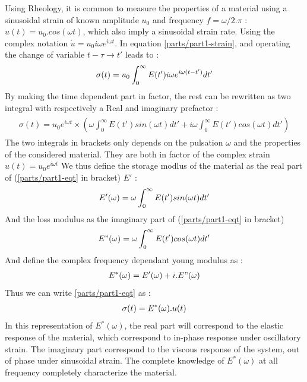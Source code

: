 \documentclass[A4paperpaper,11pt,english]{sphinxmanual}
\begin{document}
Using Rheology, it is common to measure the properties of a material using a
sinusoidal strain of known amplitude \(u_0\) and frequency \(f =
\omega/ 2.\pi\) : \(u(t) = u_0.cos(\omega t)\), which also imply a
sinusoidal strain rate. Using the complex notation \(\dot u = u_0 i\omega
e^{i\omega t}\). In equation \eqref{parts/part1-strain}, and operating the change of variable \(t-\tau \to t'\)  leads to :
\begin{gather}
\begin{split}\sigma(t) = u_0\int_0^\infty E(t') i\omega e^{i\omega(t-t')}dt'\end{split}\notag
\end{gather}
By making the time dependent part in factor, the rest can be rewritten as two integral with respectively a Real and imaginary prefactor :
\label{parts/part1:equation-eqt}\begin{gather}
\begin{split}\sigma(t) = u_0e^{i\omega t}\times\left(
          \omega \int_0^\infty E(t')  sin(\omega t) dt'
          +
        i \omega \int_0^\infty E(t') cos(\omega t) dt'
\right)\end{split}\label{parts/part1-eqt}
\end{gather}
The two integrals in brackets only depends on the pulsation \(\omega\) and the properties of the considered material.
They are both in factor of the complex strain \(u(t) = u_0 e^{i\omega t}\)
We thus define the storage modlus of the material as the real part of (\eqref{parts/part1-eqt} in bracket) \(E'\) :
\begin{gather}
\begin{split}E'(\omega) =  \omega \int_0^\infty E(t')  sin(\omega t) dt'\end{split}\notag
\end{gather}
And the loss modulus as the imaginary part of (\eqref{parts/part1-eqt} in bracket)
\begin{gather}
\begin{split}E"(\omega) =  \omega \int_0^\infty E(t')  cos(\omega t) dt'\end{split}\notag
\end{gather}
And define the complex frequency dependant young modulus as :
\begin{gather}
\begin{split}E^*(\omega) = E'(\omega) + i.E"(\omega)\end{split}\notag
\end{gather}
Thus we can write \eqref{parts/part1-eqt} as :
\begin{gather}
\begin{split}\sigma(t) = E^*(\omega).u(t)\end{split}\notag
\end{gather}
In this representation of \(E^*(\omega)\), the real part will correspond to
the elastic response of the material, which correspond to in-phase response
under oscillatory strain. The imaginary part correspond to the viscous response
of the system, out of phase under sinusoidal strain. The complete knowledge of
\(E^*(\omega)\) at all frequency completely characterize the material.
\end{document}
